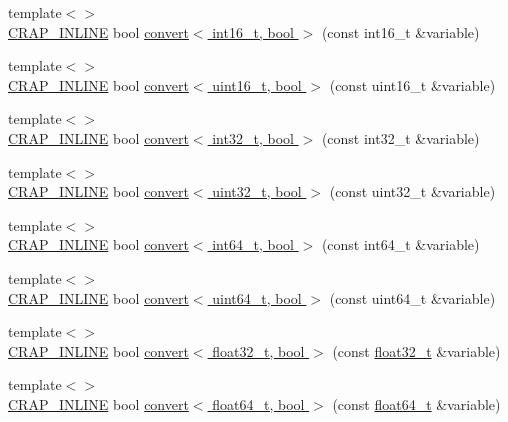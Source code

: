 \begin{DoxyCompactItemize}
\item 
{\footnotesize template$<$$>$ }\\\hyperlink{config__x86_8h_a5a40526b8d842e7ff731509998bb0f1c}{C\+R\+A\+P\+\_\+\+I\+N\+L\+I\+N\+E} bool \hyperlink{namespacecrap_a867fa097545f048e8f4af21e1527b9d3}{convert$<$ int16\+\_\+t, bool $>$} (const int16\+\_\+t \&variable)
\item 
{\footnotesize template$<$$>$ }\\\hyperlink{config__x86_8h_a5a40526b8d842e7ff731509998bb0f1c}{C\+R\+A\+P\+\_\+\+I\+N\+L\+I\+N\+E} bool \hyperlink{namespacecrap_ae43a81903acd28785d050ba4b12e6f99}{convert$<$ uint16\+\_\+t, bool $>$} (const uint16\+\_\+t \&variable)
\item 
{\footnotesize template$<$$>$ }\\\hyperlink{config__x86_8h_a5a40526b8d842e7ff731509998bb0f1c}{C\+R\+A\+P\+\_\+\+I\+N\+L\+I\+N\+E} bool \hyperlink{namespacecrap_a749f938b808d7ef790e816c792054e32}{convert$<$ int32\+\_\+t, bool $>$} (const int32\+\_\+t \&variable)
\item 
{\footnotesize template$<$$>$ }\\\hyperlink{config__x86_8h_a5a40526b8d842e7ff731509998bb0f1c}{C\+R\+A\+P\+\_\+\+I\+N\+L\+I\+N\+E} bool \hyperlink{namespacecrap_a8dbc15ac6e25698450ac54398312af8f}{convert$<$ uint32\+\_\+t, bool $>$} (const uint32\+\_\+t \&variable)
\item 
{\footnotesize template$<$$>$ }\\\hyperlink{config__x86_8h_a5a40526b8d842e7ff731509998bb0f1c}{C\+R\+A\+P\+\_\+\+I\+N\+L\+I\+N\+E} bool \hyperlink{namespacecrap_a6d8d2d7af3e2ca06073976a95dce1a19}{convert$<$ int64\+\_\+t, bool $>$} (const int64\+\_\+t \&variable)
\item 
{\footnotesize template$<$$>$ }\\\hyperlink{config__x86_8h_a5a40526b8d842e7ff731509998bb0f1c}{C\+R\+A\+P\+\_\+\+I\+N\+L\+I\+N\+E} bool \hyperlink{namespacecrap_a0c45e5535adffc501e93cf2d97878367}{convert$<$ uint64\+\_\+t, bool $>$} (const uint64\+\_\+t \&variable)
\item 
{\footnotesize template$<$$>$ }\\\hyperlink{config__x86_8h_a5a40526b8d842e7ff731509998bb0f1c}{C\+R\+A\+P\+\_\+\+I\+N\+L\+I\+N\+E} bool \hyperlink{namespacecrap_a0993f6638b4cf291cf6d24f6f0ec5df1}{convert$<$ float32\+\_\+t, bool $>$} (const \hyperlink{crap__types_8h_a4611b605e45ab401f02cab15c5e38715}{float32\+\_\+t} \&variable)
\item 
{\footnotesize template$<$$>$ }\\\hyperlink{config__x86_8h_a5a40526b8d842e7ff731509998bb0f1c}{C\+R\+A\+P\+\_\+\+I\+N\+L\+I\+N\+E} bool \hyperlink{namespacecrap_af500e2a45006f67b11d73cadd17ac47c}{convert$<$ float64\+\_\+t, bool $>$} (const \hyperlink{crap__types_8h_ac55f3ae81b5bc9053760baacf57e47f4}{float64\+\_\+t} \&variable)

\end{DoxyCompactItemize}

